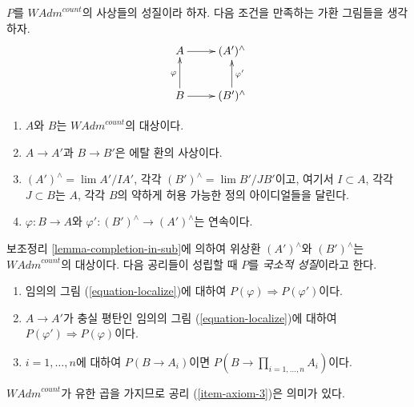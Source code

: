\begin{situation}
\label{situation-local-property}
$P$를 $\textit{WAdm}^{count}$의 사상들의 성질이라 하자. 다음 조건을
만족하는 가환 그림들을 생각하자.
\begin{equation}
\label{equation-localize}
\vcenter{
\xymatrix{
A \ar[r] & (A')^\wedge \\
B \ar[r] \ar[u]^\varphi & (B')^\wedge \ar[u]_{\varphi'}
}
}
\end{equation}
\begin{enumerate}
\item $A$와 $B$는 $\textit{WAdm}^{count}$의 대상이다.
\item $A \to A'$과 $B \to B'$은 에탈 환의 사상이다.
\item $(A')^\wedge = \lim A'/IA'$, 각각
$(B')^\wedge = \lim B'/JB'$이고, 여기서 $I \subset A$, 각각
$J \subset B$는 $A$, 각각 $B$의 약하게 허용 가능한 정의
아이디얼들을 달린다. %
\item $\varphi : B \to A$와
$\varphi' : (B')^\wedge \to (A')^\wedge$는 연속이다.
\end{enumerate}
보조정리 \ref{lemma-completion-in-sub}에 의하여 위상환
$(A')^\wedge$와 $(B')^\wedge$는 $\textit{WAdm}^{count}$의 대상이다.
다음 공리들이 성립할 때 $P$를 {\it 국소적 성질}이라고 한다.
\begin{enumerate}
\item
\label{item-axiom-1}
임의의 그림 (\ref{equation-localize})에 대하여
$P(\varphi) \Rightarrow P(\varphi')$이다.
\item
\label{item-axiom-2}
$A \to A'$가 충실 평탄인 임의의 그림
(\ref{equation-localize})에 대하여
$P(\varphi') \Rightarrow P(\varphi)$이다.
\item
\label{item-axiom-3}
$i = 1, \ldots, n$에 대하여 $P(B \to A_i)$이면
$P(B \to \prod_{i = 1, \ldots, n} A_i)$이다.
\end{enumerate}
$\textit{WAdm}^{count}$가 유한 곱을 가지므로 공리
(\ref{item-axiom-3})은 의미가 있다.
\end{situation}

